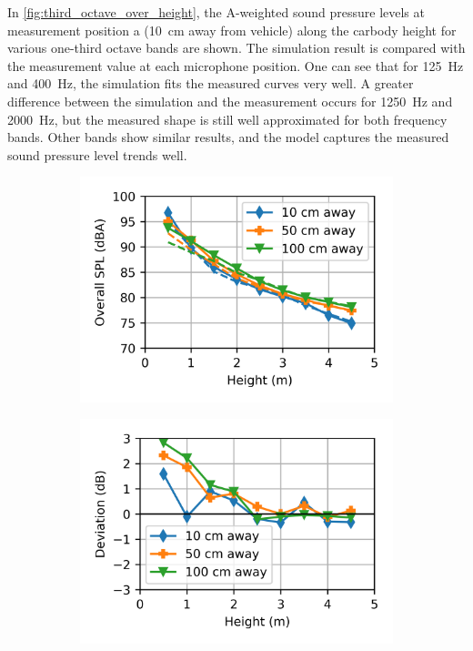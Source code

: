 In \cref{fig:third_octave_over_height}, the A-weighted sound pressure levels at measurement position a (\SI{10}{\centi\meter} away from vehicle) along the carbody height for various one-third octave bands are shown. The simulation result is compared with the measurement value at each microphone position. One can see that for \SI{125}{\hertz} and \SI{400}{\hertz}, the simulation fits the measured curves very well. A greater difference between the simulation and the measurement occurs for \SI{1250}{\hertz} and \SI{2000}{\hertz}, but the measured shape is still well approximated for both frequency bands. Other bands show similar results, and the model captures the measured sound pressure level trends well.

\begin{figure}%
	\centering
	\begin{subfigure}[b]{0.49\textwidth}
		\centering
		\includegraphics{fig/chap5/initial_model/overall_SPL/all_pos.png}
	\end{subfigure}
	\hfill
	\begin{subfigure}[b]{0.49\textwidth}
		\centering
		\includegraphics{fig/chap5/initial_model/overall_SPL/deviation.png}

\end{subfigure}
\end{figure}
